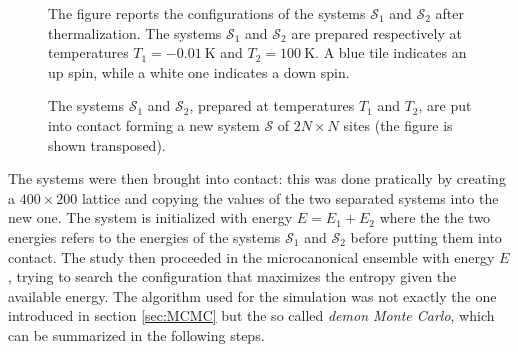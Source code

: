 \begin{figure}[hbtp]
\begin{minipage}[c]{0.45\textwidth}
    \end{minipage}
    \hfill
    \caption{The figure reports the configurations of the systems $\mathcal{S}_1$ and $\mathcal{S}_2$ after thermalization. The systems $\mathcal{S}_1$ and $\mathcal{S}_2$ are prepared respectively at temperatures $T_1 = \SI{-0.01}{\kelvin}$ and $T_2 = \SI{100}{\kelvin}$. A blue tile indicates an up spin, while a white one indicates a down spin.}
    \label{fig:contact_initial}
\end{figure}
\vspace{10pt}
\begin{figure}[htbp]
    \centering
    \caption{The systems $\mathcal{S}_1$ and $\mathcal{S}_2$, prepared at temperatures $T_1$ and $T_2$, are put into contact forming a new system $\mathcal{S}$ of $2N \times N$ sites (the figure is shown transposed).}
    \label{fig:contact_symbolized}
\end{figure}
The systems were then brought into contact: this was done pratically by creating a $400 \times 200$ lattice and copying the values of the two separated systems into the new one. The system is initialized 
with energy $E = E_1 + E_2$ where the the two energies refers to the energies of the systems $\mathcal{S}_1$ and $\mathcal{S}_2$ before putting them into contact. The study then proceeded in the microcanonical ensemble 
with energy $E$, trying to search the configuration that maximizes the entropy given the available energy. The algorithm used for the simulation was not exactly the one introduced in section \ref{sec:MCMC} but the so called \emph{demon Monte Carlo}, which can be summarized in the following steps. \\
